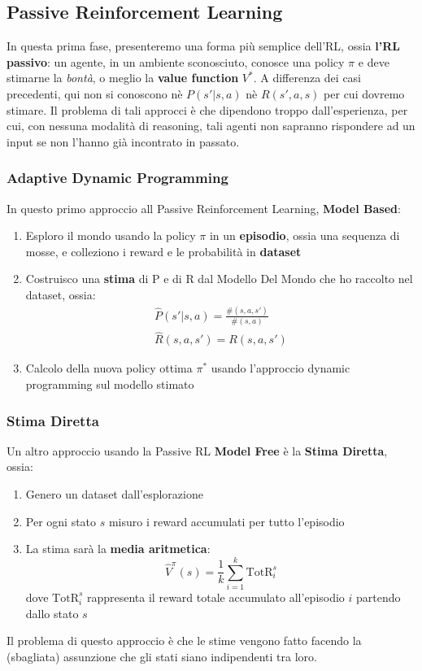 \subsection{Passive Reinforcement Learning}
In questa prima fase, presenteremo una forma più semplice dell'RL, ossia \textbf{l'RL passivo}: un agente, in un ambiente sconosciuto,
conosce una policy $\pi$ e deve stimarne la \textit{bontà}, o meglio la \textbf{value function} $V^*$. A differenza dei casi precedenti,
qui non si conoscono nè $P(s'|s,a)$ nè $R(s',a,s)$ per cui dovremo stimare. Il problema di tali approcci è che dipendono troppo dall'esperienza,
per cui, con nessuna modalità di reasoning, tali agenti non sapranno rispondere ad un input se non l'hanno già incontrato in passato.

\subsubsection{Adaptive Dynamic Programming}
In questo primo approccio all Passive Reinforcement Learning, \textbf{Model Based}:
\begin{enumerate}
    \item Esploro il mondo usando la policy $\pi$ in un \textbf{episodio}, ossia una sequenza di mosse, e colleziono i reward e le probabilità in \textbf{dataset}
    \item Costruisco una \textbf{stima} di P e di R dal Modello Del Mondo che ho raccolto nel dataset, ossia:
    \begin{gather}
        \widehat{P}(s'|s,a) = \frac{\#(s,a,s')}{\#(s,a)} \\
        \widehat{R}(s,a,s') = R(s,a,s') 
    \end{gather}
    \item Calcolo della nuova policy ottima $\pi^*$ usando l'approccio dynamic programming sul modello stimato
\end{enumerate}

\subsubsection{Stima Diretta}
Un altro approccio usando la Passive RL \textbf{Model Free} è la \textbf{Stima Diretta}, ossia:
\begin{enumerate}
    \item Genero un dataset dall'esplorazione
    \item Per ogni stato $s$ misuro i reward accumulati per tutto l'episodio
    \item La stima sarà la \textbf{media aritmetica}:
    \begin{equation}
        \widehat{V}^\pi(s) = \frac{1}{k}\sum_{i = 1}^{k} \text{TotR}^s_i
    \end{equation}
    dove $\text{TotR}^s_i$ rappresenta il reward totale accumulato all'episodio $i$ partendo dallo stato $s$
\end{enumerate}
Il problema di questo approccio è che le stime vengono fatto facendo la (sbagliata) assunzione che gli stati siano indipendenti tra loro.